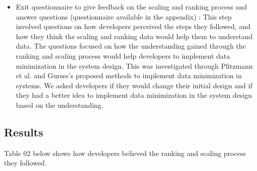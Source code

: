 \documentclass{sigchi}
\begin{document}
\begin{itemize}
\item Exit questionnaire to give feedback on the scaling and ranking process and answer questions (questionnaire available in the appendix) :  This step involved questions on how developers perceived the steps they followed, and how they think the scaling and ranking data would help them to understand data. The questions focused on how the understanding gained through the ranking and scaling process would help developers to implement data minimization in the system design. This was investigated through  Pfitzmann et al. \cite {pfitzmann2010terminology} and Gurses's \cite {gurses2015engineering} proposed methods to implement data minimization in systems. We asked developers if they would change their initial design and if they had a better idea to implement data minimization in the system design based on the understanding.
\end{itemize}


\subsection {Results}

Table 02 below shows how developers believed the ranking and scaling process they followed. 
\end{document}
